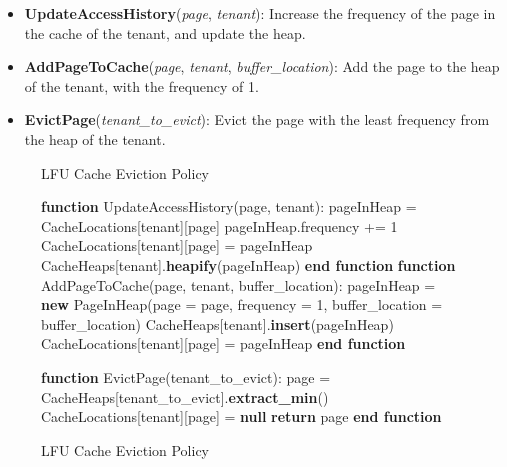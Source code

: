 \begin{itemize}
    \item \textbf{UpdateAccessHistory}(\textit{page}, \textit{tenant}): Increase the frequency of the page in the cache of the tenant, and update the heap.
    \item \textbf{AddPageToCache}(\textit{page}, \textit{tenant}, \textit{buffer\_location}): Add the page to the heap of the tenant, with the frequency of 1.
    \item \textbf{EvictPage}(\textit{tenant\_to\_evict}): Evict the page with the least frequency from the heap of the tenant.
\end{itemize}

\begin{figure}[htbp]
    \centering
    \begin{minipage}{\linewidth}
    \begin{algorithm}[H]
        \caption{LFU Cache Eviction Policy}
        \begin{algorithmic}
            \STATE \textbf{function} UpdateAccessHistory(page, tenant):
            \STATE \hspace{\algorithmicindent} pageInHeap = CacheLocations[tenant][page]
            \STATE \hspace{\algorithmicindent} pageInHeap.frequency += 1
            \STATE \hspace{\algorithmicindent} CacheLocations[tenant][page] = pageInHeap
            \STATE \hspace{\algorithmicindent} CacheHeaps[tenant].\textbf{heapify}(pageInHeap)
            \STATE \textbf{end function}
            \STATE
            \STATE \textbf{function} AddPageToCache(page, tenant, buffer\_location):
            \STATE \hspace{\algorithmicindent} pageInHeap = \textbf{new} PageInHeap(page = page, frequency = 1, buffer\_location = buffer\_location)
            \STATE \hspace{\algorithmicindent} CacheHeaps[tenant].\textbf{insert}(pageInHeap)
            \STATE \hspace{\algorithmicindent} CacheLocations[tenant][page] = pageInHeap
            \STATE \textbf{end function}

            \STATE
            \STATE \textbf{function} EvictPage(tenant\_to\_evict):
            \STATE \hspace{\algorithmicindent} page = CacheHeaps[tenant\_to\_evict].\textbf{extract\_min}()
            \STATE \hspace{\algorithmicindent} CacheLocations[tenant][page] = \textbf{null}
            \STATE \hspace{\algorithmicindent} \textbf{return} page
            \STATE \textbf{end function}
        \end{algorithmic}
    \end{algorithm}
    \caption{LFU Cache Eviction Policy}
    \label{fig:lfu}
    \end{minipage}
\end{figure}

